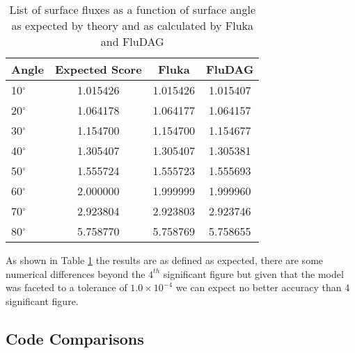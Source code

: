 \documentclass{anstrans}
\begin{document}

\begin{table}[h!]
        \begin{center}
                \begin{tabular}{|l|c|c|c|}
                  \hline
                        Angle & Expected Score & Fluka  & FluDAG \\
                        \hline
                        10$^{\circ}$ & 1.015426 & 1.015426 & 1.015407\\
                        20$^{\circ}$ & 1.064178 & 1.064177 & 1.064157\\
                        30$^{\circ}$ & 1.154700 & 1.154700 & 1.154677\\
                        40$^{\circ}$ & 1.305407 & 1.305407 & 1.305381\\
                        50$^{\circ}$ & 1.555724 & 1.555723 & 1.555693\\
                        60$^{\circ}$ & 2.000000 & 1.999999 & 1.999960\\
                        70$^{\circ}$ & 2.923804 & 2.923803 & 2.923746\\
                        80$^{\circ}$ & 5.758770 & 5.758769 & 5.758655\\
                        \hline
                \end{tabular}
                \caption{List of surface fluxes as a function of surface
                         angle as expected by theory and as calculated by 
                         Fluka and FluDAG}
                \label{usrbdx_crossing}
                \end{center}
\end{table}
As shown in Table \ref{usrbdx_crossing} the results are as defined as expected, 
there are some numerical differences beyond the $4^{th}$ significant figure but given that the model
was faceted to a tolerance of $1.0\times 10^{-4}$ we can expect no better accuracy 
than 4 significant figure.

\subsection{Code Comparisons}
\end{document}
